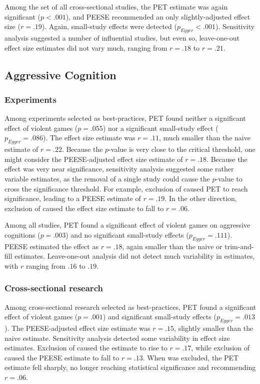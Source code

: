 \documentclass[man]{apa6}
\begin{document}
Among the set of all cross-sectional studies, the PET estimate was again significant ($p < .001$), and PEESE recommended an only slightly-adjusted effect size ($r = .19$). Again, small-study effects were detected ($p_{Egger} < .001$). Sensitivity analysis suggested a number of influential studies, but even so, leave-one-out effect size estimates did not vary much, ranging from $r = .18$ to $r = .21$.

\subsection{Aggressive Cognition}
\subsubsection{Experiments}
Among experiments selected as best-practices, PET found neither a significant effect of violent games ($p = .055$) nor a significant small-study effect ($p_{Egger} = .086$). The effect size estimate was $r = .11$, much smaller than the naive estimate of $r = .22$. Because the $p$-value is very close to the critical threshold, one might consider the PEESE-adjusted effect size estimate of $r = .18$. Because the effect was very near significance, sensitivity analysis suggested some rather variable estimates, as the removal of a single study could cause the $p$-value to cross the significance threshold. For example, exclusion of \citet{Bushman:Anderson:2009} caused PET to reach significance, leading to a PEESE estimate of $r = .19$. In the other direction, exclusion of \citet{Anderson:Dill:2000} caused the effect size estimate to fall to $r = .06$.

Among all studies, PET found a significant effect of violent games on aggressive cognitions ($p = .003$) and no significant small-study effects ($p_{Egger} = .111$). PEESE estimated the effect as $r = .18$, again smaller than the naive or trim-and-fill estimates. Leave-one-out analysis did not detect much variability in estimates, with $r$ ranging from $.16$ to $.19$. 

\subsubsection{Cross-sectional research}
Among cross-sectional research selected as best-practices, PET found a significant effect of violent games ($p = .001$) and significant small-study effects ($p_{Egger} = .013$). The PEESE-adjusted effect size estimate was $r = .15$, slightly smaller than the naive estimate. Sensitivity analysis detected some variability in effect size estimates. Exclusion of \citet{Yukawa:Sakamoto:2001} caused the estimate to rise to $r = .17$, while exclusion of \citet{Funk:etal:2003} caused the PEESE estimate to fall to $r = .13$. When \citet{Anderson:etal:2004} was excluded, the PET estimate fell sharply, no longer reaching statistical significance and recommending $r = .06$.
\end{document}
